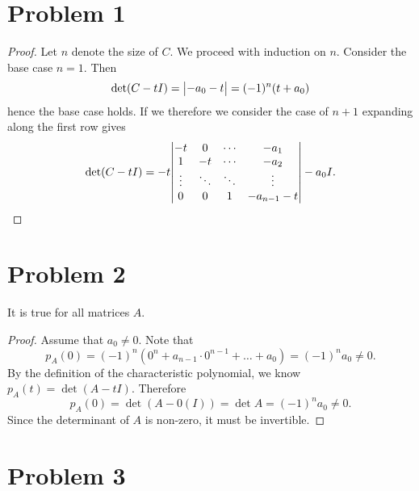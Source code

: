 \documentclass{article}
\begin{document}
\section*{Problem 1}
\begin{proof}
    Let $n$ denote the size of $C$. We proceed with induction on $n$. Consider the base case $n = 1$. Then
    \[
        \det(C - t I) = \mqty| -a_0 - t | = (-1)^n (t + a_0)
    \]
    hence the base case holds. If we therefore we consider the case of $n+1$ expanding along the first row gives
    \[
        \det (C - t I) = -t \mqty|
            -t & 0 & \cdots & -a_1 \\
            1  & -t & \cdots & -a_2 \\
            \vdots & \ddots & \ddots & \vdots \\
            0 & 0 & 1 & -a_{n-1} - t \\
        | - a_0 I
    .\]
\end{proof}

\section*{Problem 2}
It is true for all matrices $A$. 

\begin{proof}
    Assume that $a_0 \neq 0$. Note that
    \[
        p_{A}(0) = (-1)^n (0^n + a_{n-1} \cdot 0^{n-1} + \ldots + a_0) = (-1)^n a_0 \neq 0
    .\]
    By the definition of the characteristic polynomial, we know $p_A(t) = \det(A - t I)$. Therefore
    \[
        p_A(0) = \det(A - 0(I)) = \det A = (-1)^n a_0 \neq 0
    .\]
    Since the determinant of $A$ is non-zero, it must be invertible.
\end{proof}

\section*{Problem 3}
\end{document}
